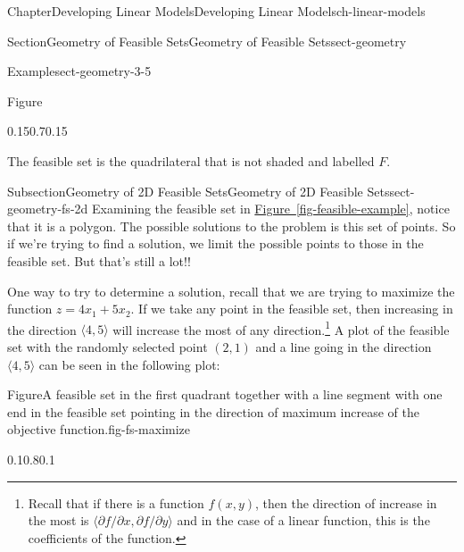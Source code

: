 \documentclass[oneside,10pt,]{book}
\newcommand{\xreffont}{\relax}
\numberwithin{equation}{section}
\begin{document}
\begin{chapterptx}{Chapter}{Developing Linear Models}{}{Developing Linear Models}{}{}{ch-linear-models}
\begin{sectionptx}{Section}{Geometry of Feasible Sets}{}{Geometry of Feasible Sets}{}{}{sect-geometry}
\begin{introduction}{}
\begin{example}{Example}{}{sect-geometry-3-5}
\begin{figureptx}{Figure}
\begin{image}{0.15}{0.7}{0.15}{}
{%
}%
\end{image}%
\tcblower
\end{figureptx}%
The feasible set is the quadrilateral that is not shaded and labelled \(F\).%
\end{example}
\end{introduction}%
%
%
\typeout{************************************************}
\typeout{************************************************}
%
\begin{subsectionptx}{Subsection}{Geometry of 2D Feasible Sets}{}{Geometry of 2D Feasible Sets}{}{}{sect-geometry-fs-2d}
Examining the feasible set in \hyperref[fig-feasible-example]{Figure~{\xreffont\ref{fig-feasible-example}}}, notice that it is a polygon. The possible solutions to the problem is this set of points. So if we're trying to find a solution, we limit the possible points to those in the feasible set. But that's still a lot!!%
\par
One way to try to determine a solution, recall that we are trying to maximize the function \(z = 4x_1 + 5x_2\). If we take any point in the feasible set, then increasing in the direction \(\langle 4, 5 \rangle\) will increase the most of any direction.\footnote{Recall that if there is a function \(f(x,y)\), then the direction of increase in the most is \(\langle \partial f/\partial x, \partial f/\partial y \rangle\) and in the case of a linear function, this is the coefficients of the function.\label{sect-geometry-fs-2d-3-3}} A plot of the feasible set with the randomly selected point \((2,1)\) and a line going in the direction \(\langle 4, 5 \rangle\) can be seen in the following plot:%
\begin{figureptx}{Figure}{A feasible set in the first quadrant together with a line segment with one end in the feasible set pointing in the direction of maximum increase of the objective function.}{fig-fs-maximize}{}%
\begin{image}{0.1}{0.8}{0.1}{}%
\end{image}
\end{figureptx}
\end{subsectionptx}
\end{sectionptx}
\end{chapterptx}
\end{document}

